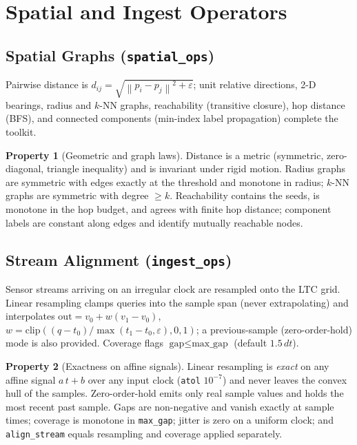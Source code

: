 \documentclass[11pt]{article}
\theoremstyle{definition}
\newtheorem{property}{Property}[section]
\newcommand{\norm}[1]{\left\lVert #1 \right\rVert}
\newcommand{\code}[1]{\texttt{#1}}
\newcommand{\eps}{\varepsilon}
\begin{document}
\section{Spatial and Ingest Operators}\label{sec:ingest}

\subsection{Spatial Graphs (\code{spatial\_ops})}
Pairwise distance is $d_{ij}=\sqrt{\norm{p_i-p_j}^2+\eps}$; unit relative
directions, 2-D bearings, radius and $k$-NN graphs, reachability (transitive
closure), hop distance (BFS), and connected components (min-index label
propagation) complete the toolkit.

\begin{property}[Geometric and graph laws]
Distance is a metric (symmetric, zero-diagonal, triangle inequality) and is
invariant under rigid motion. Radius graphs are symmetric with edges exactly
at the threshold and monotone in radius; $k$-NN graphs are symmetric with
degree $\ge k$. Reachability contains the seeds, is monotone in the hop
budget, and agrees with finite hop distance; component labels are constant
along edges and identify mutually reachable nodes.
\end{property}

\subsection{Stream Alignment (\code{ingest\_ops})}
Sensor streams arriving on an irregular clock are resampled onto the LTC
grid. Linear resampling clamps queries into the sample span (never
extrapolating) and interpolates
$\text{out}=v_0+w(v_1-v_0)$, $w=\mathrm{clip}((q-t_0)/\max(t_1-t_0,\eps),0,1)$;
a previous-sample (zero-order-hold) mode is also provided. Coverage flags
$\text{gap}\le\text{max\_gap}$ (default $1.5\,dt$).

\begin{property}[Exactness on affine signals]
Linear resampling is \emph{exact} on any affine signal $a\,t+b$ over any
input clock (\code{atol} $10^{-7}$) and never leaves the convex hull of the
samples. Zero-order-hold emits only real sample values and holds the most
recent past sample. Gaps are non-negative and vanish exactly at sample
times; coverage is monotone in \code{max\_gap}; jitter is zero on a uniform
clock; and \code{align\_stream} equals resampling and coverage applied
separately.
\end{property}
\end{document}
